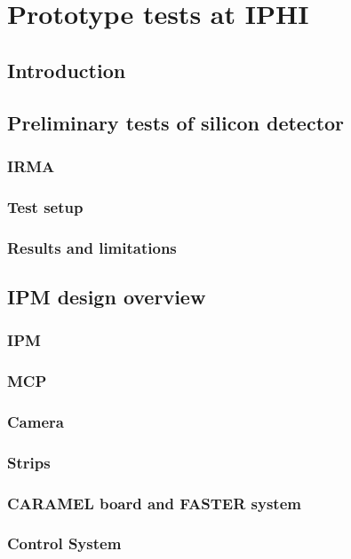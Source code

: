\chapter{Prototype tests at IPHI}
\cleardoublepage

\minitoc

\section{Introduction}
\begin{refsection}
	\label{ch4:Introduction}

	\section{Preliminary tests of silicon detector}
	\subsection{IRMA}
	\subsection{Test setup}
	\subsection{Results and limitations}

	\section{IPM design overview}
	\subsection{IPM}
	\subsection{MCP}
	\subsection{Camera}
	\subsection{Strips}
	\subsection{CARAMEL board and FASTER system}
	\subsection{Control System}

\end{refsection}

